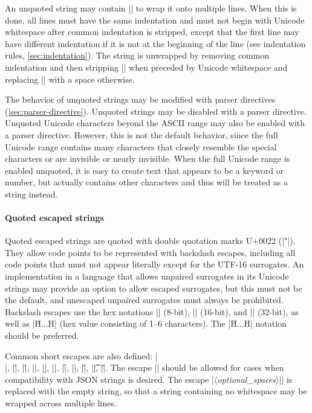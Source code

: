 \documentclass[11pt]{article}
\newcommand{\vmeta}[1]{{\color{DarkRed}\ensuremath{\langle}\textit{#1}\ensuremath{\rangle}}}
\begin{document}
An unquoted string may contain |\n| to wrap it onto multiple lines.  When this is done, all lines must have the same indentation and must not begin with Unicode whitespace after common indentation is stripped, except that the first line may have different indentation if it is not at the beginning of the line (see indentation rules, \cref{sec:indentation}).  The string is unwrapped by removing common indentation and then stripping |\n| when preceded by Unicode whitespace and replacing |\n| with a space otherwise.

The behavior of unquoted strings may be modified with parser directives (\cref{sec:parser-directive}).  Unquoted strings may be disabled with a parser directive.  Unquoted Unicode characters beyond the ASCII range may also be enabled with a parser directive.  However, this is not the default behavior, since the full Unicode range contains many characters that closely resemble the special characters or are invisible or nearly invisible.  When the full Unicode range is enabled unquoted, it is easy to create text that appears to be a keyword or number, but actually contains other characters and thus will be treated as a string instead.


\paragraph{Quoted escaped strings}

Quoted escaped strings are quoted with double quotation marks U+0022 (|"|).  They allow code points to be represented with backslash escapes, including all code points that must not appear literally except for the UTF-16 surrogates.  An implementation in a language that allows unpaired surrogates in its Unicode strings may provide an option to allow escaped surrogates, but this must not be the default, and unescaped unpaired surrogates must always be prohibited.  Backslash escapes use the hex notations |\xHH| (8-bit), |\uHHHH| (16-bit), and |\UHHHHHHHH| (32-bit), as well as |\u{H...H}| (hex value consisting of 1--6 characters).  The |\u{H...H}| notation should be preferred.

Common short escapes are also defined:  |\\|, |\'|, |\"|, |\a|, |\b|, |\e|, |\f|, |\n|, |\r|, |\t|, |\v|.  The escape |\/| should be allowed for cases when compatibility with JSON strings is desired.  The escape |\|\vmeta{optional\_spaces}|\n| is replaced with the empty string, so that a string containing no whitespace may be wrapped across multiple lines.
\end{document}
